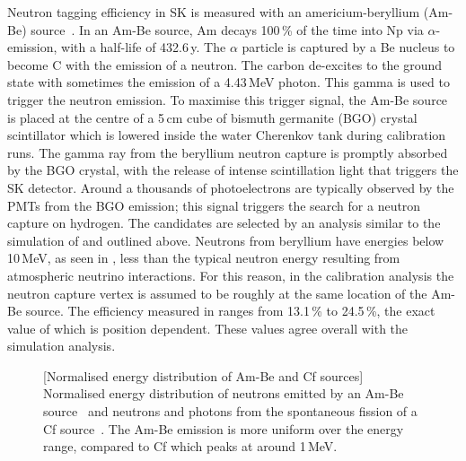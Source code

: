 
Neutron tagging efficiency in SK is measured with an americium-beryllium (Am-Be) source~\cite{Watanabe:2008ru}.
In an Am-Be source, Am decays 100\,\% of the time into Np via $\alpha$-emission, %
with a half-life of 432.6\,y.
The $\alpha$ particle is captured by a Be nucleus to become C\tapi{*} with the emission of a neutron.
The carbon de-excites to the ground state with sometimes the emission of a 4.43\,MeV photon.
This gamma is used to trigger the neutron emission.
To maximise this trigger signal, the Am-Be source is placed at the centre of a 5\,cm cube of %
bismuth germanite (BGO) crystal scintillator which is lowered inside the water Cherenkov tank during calibration runs.
The gamma ray from the beryllium neutron capture is promptly absorbed by the BGO crystal, %
with the release of intense scintillation light that triggers the SK detector. 
Around a thousands of photoelectrons are typically observed by the PMTs from the BGO emission; %
this signal triggers the search for a neutron capture on hydrogen.
The candidates are selected by an analysis similar to the simulation of  and outlined above.
Neutrons from beryllium have energies below 10\,MeV, as seen in , %
less than the typical neutron energy resulting from atmospheric neutrino interactions.
For this reason, in the calibration analysis the neutron capture vertex is assumed to be roughly at the same location %
of the Am-Be source.
The efficiency measured in  ranges from 13.1\,\% to 24.5\,\%, %
the exact value of which is position dependent.
These values agree overall with the simulation analysis.

\begin{figure}
	\centering
	\resizebox{0.6\textwidth}{!}{}
	[Normalised energy distribution of Am-Be and Cf sources]%
	{Normalised energy distribution of neutrons emitted by an Am-Be source~\cite{PMID:4744412} %
	and neutrons and photons from the spontaneous fission of a Cf source~\cite{PhysRev.104.699, PhysRev.108.411}.
	The Am-Be emission is more uniform over the energy range, compared to Cf which %
	peaks at around 1\,MeV.}
	\label{fig:spectra}
\end{figure}


